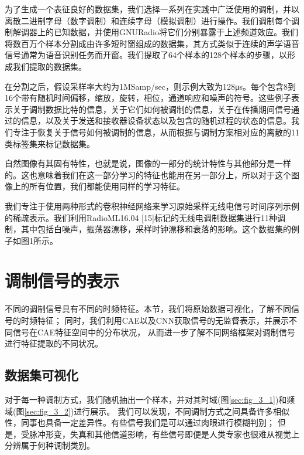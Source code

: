 为了生成一个表征良好的数据集，我们选择一系列在实践中广泛使用的调制，并以离散二进制字母（数字调制）和连续字母（模拟调制）进行操作。我们调制每个调制解调器上的已知数据，并使用GNURadio将它们分别暴露于上述频道效应。我们将数百万个样本分割成由许多短时窗组成的数据集，其方式类似于连续的声学语音信号通常为语音识别任务而开窗。我们提取了64个样本的128个样本的步骤，以形成我们提取的数据集。\par

在分割之后，假设采样率大约为1MSamp/sec，则示例大致为128μs。每个包含8到16个带有随机时间偏移，缩放，旋转，相位，通道响应和噪声的符号。这些例子表示关于调制数据比特的信息，关于它们如何被调制的信息，关于在传播期间信号通过的信息，以及关于发送和接收器设备状态以及包含的随机过程的状态的信息。我们专注于恢复关于信号如何被调制的信息，从而根据与调制方案相对应的离散的11类标签集来标记数据集。\par


自然图像有其固有特性，也就是说，图像的一部分的统计特性与其他部分是一样的。这也意味着我们在这一部分学习的特征也能用在另一部分上，所以对于这个图像上的所有位置，我们都能使用同样的学习特征。\par

我们专注于使用两种形式的卷积神经网络来学习原始采样无线电信号时间序列示例的稀疏表示。我们利用RadioML16.04 [15]标记的无线电调制数据集进行11种调制，其中包括白噪声，振荡器漂移，采样时钟漂移和衰落的影响。这个数据集的例子如图1所示。\par


\section{调制信号的表示}

不同的调制信号具有不同的时频特征。本节，我们将原始数据可视化，了解不同信号的时频特征；
同时，我们利用CAE以及CNN获取信号的无监督表示，并展示不同信号在CAE特征空间中的分布状况，
从而进一步了解不同网络框架对调制信号进行特征提取的不同状况。

\subsection{数据集可视化}

对于每一种调制方式，我们随机抽出一个样本，并对其时域(图\ref{sec:fig_3_1})和频域(图\ref{sec:fig_3_2})进行展示。
我们可以发现，不同调制方式之间具备许多相似性，同事也具备一定差异性。有些信号我们是可以通过肉眼进行模糊判别；
但是，受脉冲形变，失真和其他信道影响，有些信号即便是人类专家也很难从视觉上分辨属于何种调制类别。\par

